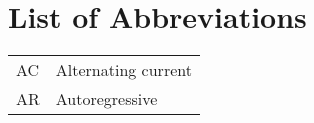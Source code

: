 \chapter*{List of Abbreviations}
\label{list:LstAbb}
\begin{flushleft}
\begin{longtable}{lp{12cm}}
AC	&	Alternating current	\\
AR	&	Autoregressive	\\
\end{longtable}
\end{flushleft}

